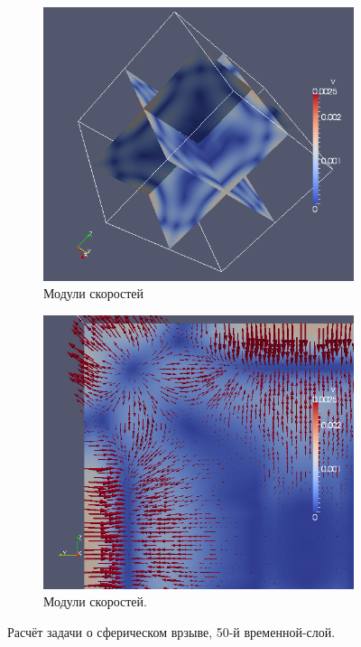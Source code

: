 \begin{figure}[htp]
\begin{subfigure}[b]{0.5\textwidth}
\centering
\includegraphics[width=\textwidth]{png/v-scalar-0050.png}
\caption{Модули скоростей}
\end{subfigure}
\begin{subfigure}[b]{0.5\textwidth}
\centering
\includegraphics[width=\textwidth]{png/v-vector-0050.png}
\caption{Модули скоростей.}
\end{subfigure}
\caption{Расчёт задачи о сферическом врзыве, 50-й временной-слой.}
\label{pic:spherical_50}
\end{figure}
\clearpage
